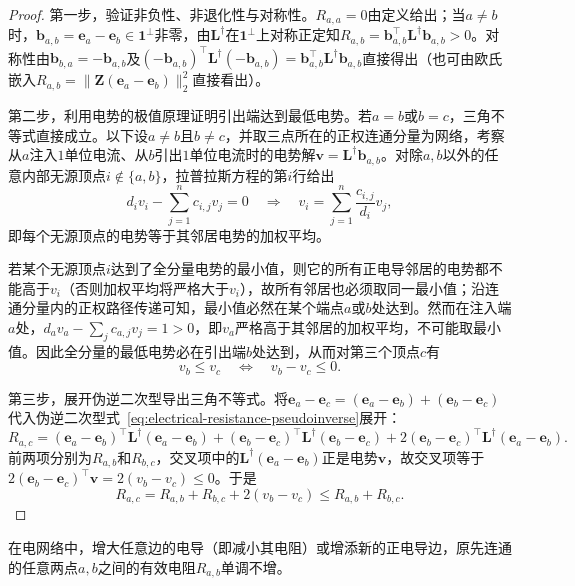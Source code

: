 \begin{proof}
第一步，验证非负性、非退化性与对称性。$R_{a,a} = 0$由定义给出；当$a \ne b$时，$\bm b_{a,b}=\bm e_a - \bm e_b\in\bm 1^\perp$非零，由$\bm L^\dagger$在$\bm 1^\perp$上对称正定知$R_{a,b} = \bm b_{a,b}^\top\bm L^\dagger\bm b_{a,b} > 0$。对称性由$\bm b_{b,a} = -\bm b_{a,b}$及$(-\bm b_{a,b})^\top \bm L^\dagger (-\bm b_{a,b}) = \bm b_{a,b}^\top \bm L^\dagger \bm b_{a,b}$直接得出（也可由欧氏嵌入$R_{a,b}=\lVert\bm Z(\bm e_a-\bm e_b)\rVert_2^2$直接看出）。

第二步，利用电势的极值原理证明引出端达到最低电势。若$a=b$或$b=c$，三角不等式直接成立。以下设$a\ne b$且$b\ne c$，并取三点所在的正权连通分量为网络，考察从$a$注入$1$单位电流、从$b$引出$1$单位电流时的电势解$\bm v = \bm L^\dagger \bm b_{a,b}$。对除$a,b$以外的任意内部无源顶点$i\notin\{a,b\}$，拉普拉斯方程的第$i$行给出
\[
  d_i v_i - \sum_{j=1}^n c_{i,j} v_j = 0
  \quad\Longrightarrow\quad
  v_i = \sum_{j=1}^n \frac{c_{i,j}}{d_i} v_j,
\]
即每个无源顶点的电势等于其邻居电势的加权平均。

若某个无源顶点$i$达到了全分量电势的最小值，则它的所有正电导邻居的电势都不能高于$v_i$（否则加权平均将严格大于$v_i$），故所有邻居也必须取同一最小值；沿连通分量内的正权路径传递可知，最小值必然在某个端点$a$或$b$处达到。然而在注入端$a$处，$d_a v_a - \sum_j c_{a,j} v_j = 1 > 0$，即$v_a$严格高于其邻居的加权平均，不可能取最小值。因此全分量的最低电势必在引出端$b$处达到，从而对第三个顶点$c$有
\[
  v_b \leq v_c \quad\Longleftrightarrow\quad v_b - v_c \leq 0.
\]

第三步，展开伪逆二次型导出三角不等式。将$\bm e_a - \bm e_c = (\bm e_a - \bm e_b) + (\bm e_b - \bm e_c)$代入伪逆二次型式~\eqref{eq:electrical-resistance-pseudoinverse}展开：
\[
  R_{a,c}
  = (\bm e_a - \bm e_b)^\top\bm L^\dagger(\bm e_a - \bm e_b)
    + (\bm e_b - \bm e_c)^\top\bm L^\dagger(\bm e_b - \bm e_c)
    + 2(\bm e_b - \bm e_c)^\top \bm L^\dagger (\bm e_a - \bm e_b).
\]
前两项分别为$R_{a,b}$和$R_{b,c}$，交叉项中的$\bm L^\dagger(\bm e_a-\bm e_b)$正是电势$\bm v$，故交叉项等于$2(\bm e_b-\bm e_c)^\top\bm v = 2(v_b - v_c) \leq 0$。于是
\begin{equation}
  R_{a,c} = R_{a,b} + R_{b,c} + 2(v_b - v_c) \leq R_{a,b} + R_{b,c}.
  \label{eq:electrical-resistance-triangle}
\end{equation}
\end{proof}

\begin{theorem}[有效电阻的Rayleigh单调性]
\label{thm:electrical-resistance-monotonicity}
在电网络中，增大任意边的电导（即减小其电阻）或增添新的正电导边，原先连通的任意两点$a,b$之间的有效电阻$R_{a,b}$单调不增。
\end{theorem}

